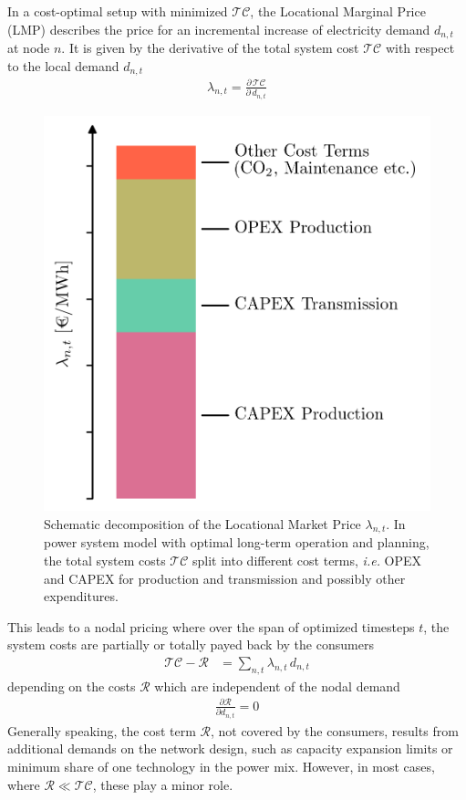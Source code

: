 \documentclass[11pt,twocolumn]{article}
\newcommand{\ie}{\textit{i.e.} }
\newcommand{\pdv}[2]{\frac{\partial #1}{\partial #2}}
\newcommand{\lmp}[1][n]{\lambda_{#1,t}}
\newcommand{\demand}[1][n]{d_{#1,t}}
\newcommand{\totalcost}{\mathcal{TC}}
\newcommand{\remainingcost}{\mathcal{R}}
\begin{document}
In a cost-optimal setup with minimized $\totalcost$, the Locational Marginal Price (LMP) describes the price for an incremental increase of electricity demand $\demand$ at node $n$. It is given by the derivative of the total system cost $\totalcost$ with respect to the local demand $\demand$
\begin{align}
\lmp = \pdv{\,\totalcost}{\,\demand}
\label{eq:lmp}
\end{align}
% 
\begin{figure}[h]
\centering
\includegraphics[width=.8\linewidth]{price_decomposition.png}
\caption{Schematic decomposition of the Locational Market Price $\lmp$. In power system model with optimal long-term operation and planning, the total system costs $\totalcost$ split into different cost terms, \ie OPEX and CAPEX for production and transmission and possibly other expenditures. }
\label{fig:price_decomposition}
\end{figure}
% 
This leads to a nodal pricing where over the span of optimized timesteps $t$, the system costs are partially or totally payed back by the consumers 
\begin{align}
\totalcost - \remainingcost &=  \sum_{n,t} \lmp \, \demand
\label{eq:total_cost_reduced}
\end{align}
depending on the costs $\remainingcost$ which are independent of the nodal demand  
\begin{align}
 \pdv{\remainingcost}{\demand} = 0
\end{align}
% 
Generally speaking, the cost term $\remainingcost$, not covered by the consumers, results from additional demands on the network design, such as capacity expansion limits or minimum share of one technology in the power mix. However, in most cases, where $\remainingcost \ll  \totalcost$, these play a minor role. 
\end{document}
